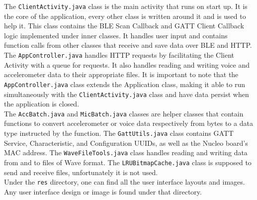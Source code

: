 The \texttt{ClientActivity.java} class is the main activity that runs on start up. It is the core of the application, every other class is written around it and is used to help it. This class contains the BLE Scan Callback and GATT Client Callback logic implemented under inner classes. It handles user input and contains function calls from other classes that receive and save data over BLE and HTTP.\\

The \texttt{AppController.java} handles HTTP requests by facilitating the Client Activity with a queue for requests. It also handles reading and writing voice and accelerometer data to their appropriate files. It is important to note that the \texttt{AppController.java} class extends the Application class, making it able to run simultaneously with the \texttt{ClientActivity.java} class and have data persist when the application is closed.\\

The \texttt{AccBatch.java} and \texttt{MicBatch.java} classes are helper classes that contain functions to convert accelerometer or voice data respectively from bytes to a data type instructed by the function. The \texttt{GattUtils.java} class contains GATT Service, Characteristic, and Configuration UUIDs, as well as the Nucleo board's MAC address. The \texttt{WaveFileTools.java} class handles reading and writing data from and to files of Wave format. The \texttt{LRUBitmapCache.java} class is supposed to send and receive files, unfortunately it is not used.\\

Under the \texttt{res} directory, one can find all the user interface layouts and images. Any user interface design or image is found under that directory. 
